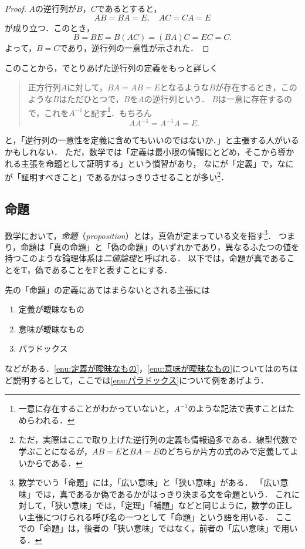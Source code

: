 \begin{tleftbar}
  \begin{proof}
    $A$の逆行列が$B$，$C$であるとすると，
    \[
      AB=BA=E,\quad AC=CA=E
    \]
    が成り立つ．このとき，
    \[
      B=BE=B(AC)=(BA)C=EC=C.
    \]
    よって，$B=C$であり，逆行列の一意性が示された．
  \end{proof}
\end{tleftbar}

このことから，でとりあげた逆行列の定義をもっと詳しく

\begin{quote}
  正方行列$A$に対して，$BA = AB =E$となるような$B$が存在するとき，このような$B$はただひとつで，$B$を$A$の逆行列という．
  $B$は一意に存在するので，これを$A^{-1}$と記す\footnote{一意に存在することがわかっていないと，$A^{-1}$のような記法で表すことはためらわれる．}．もちろん
  \[
    AA^{-1}=A^{-1}A=E.
  \]
\end{quote}
と，「逆行列の一意性を定義に含めてもいいのではないか．」と主張する人がいるかもしれない．
ただ，数学では「定義は最小限の情報にとどめ，そこから導かれる主張を命題として証明する」という慣習があり，
なにが「定義」で，なにが「証明すべきこと」であるかはっきりさせることが多い\footnote{ただ，実際はここで取り上げた逆行列の定義も情報過多である．線型代数で学ぶことになるが，$AB=E$と$BA=E$のどちらか片方の式のみで定義してよいからである．}．

\subsection{命題}

数学において，\emph{命題}（\emph{proposition}）とは，真偽が定まっている文を指す\footnote{数学でいう「命題」には，「広い意味」と「狭い意味」がある．
「広い意味」では，真であるか偽であるかがはっきり決まる文を命題という．
これに対して，「狭い意味」では，「定理」「補題」などと同じように，数学の正しい主張につけられる呼び名の一つとして「命題」という語を用いる．
ここでの「命題」は，後者の「狭い意味」ではなく，前者の「広い意味」で用いる．}．
つまり，命題は「真の命題」と「偽の命題」のいずれかであり，異なるふたつの値を持つこのような論理体系は\emph{二値論理}と呼ばれる．
以下では，命題が真であることを$\mathrm{T}$，偽であることを$\mathrm{F}$と表すことにする．

先の「命題」の定義にあてはまらないとされる主張には
\begin{enumerate}[(1)]
  \item 定義が曖昧なもの \label{enu:定義が曖昧なもの}
  \item 意味が曖昧なもの \label{enu:意味が曖昧なもの}
  \item パラドックス \label{enu:パラドックス}
\end{enumerate}
などがある．\ref{enu:定義が曖昧なもの}，\ref{enu:意味が曖昧なもの}についてはのちほど説明するとして，ここでは\ref{enu:パラドックス}について例をあげよう．

